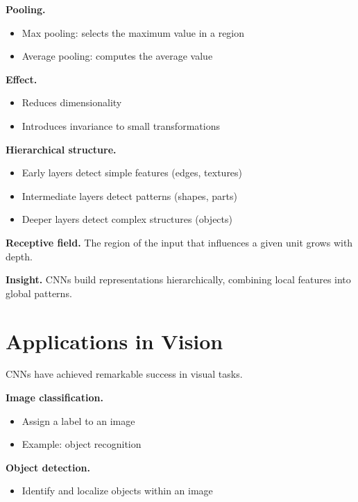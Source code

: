 \noindent
\textbf{Pooling.}
\begin{itemize}
    \item Max pooling: selects the maximum value in a region
    \item Average pooling: computes the average value
\end{itemize}

\medskip

\noindent
\textbf{Effect.}
\begin{itemize}
    \item Reduces dimensionality
    \item Introduces invariance to small transformations
\end{itemize}

\medskip

\noindent
\textbf{Hierarchical structure.}
\begin{itemize}
    \item Early layers detect simple features (edges, textures)
    \item Intermediate layers detect patterns (shapes, parts)
    \item Deeper layers detect complex structures (objects)
\end{itemize}

\medskip

\noindent
\textbf{Receptive field.}  
The region of the input that influences a given unit grows with depth.

\medskip

\noindent
\textbf{Insight.}  
CNNs build representations hierarchically, combining local features into global patterns.

\section{Applications in Vision}

CNNs have achieved remarkable success in visual tasks.

\medskip

\noindent
\textbf{Image classification.}
\begin{itemize}
    \item Assign a label to an image
    \item Example: object recognition
\end{itemize}

\medskip

\noindent
\textbf{Object detection.}
\begin{itemize}
    \item Identify and localize objects within an image
\end{itemize}

